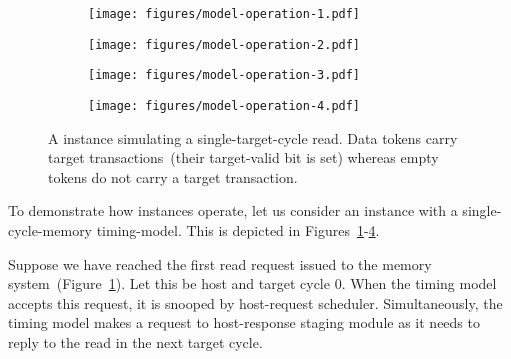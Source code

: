 \begin{figure*}[t]
	\centering
    \begin{subfigure}[t]{0.23\textwidth}
        \texttt{[image: figures/model-operation-1.pdf]}
        \caption{}
        \label{fig:model-operation-1}
    \end{subfigure}
    \begin{subfigure}[t]{0.24\textwidth}
        \texttt{[image: figures/model-operation-2.pdf]}
        \caption{}
        \label{fig:model-operation-2}
    \end{subfigure}
    \begin{subfigure}[t]{0.24\textwidth}
        \texttt{[image: figures/model-operation-3.pdf]}
        \caption{}
        \label{fig:model-operation-3}
    \end{subfigure}
    \begin{subfigure}[t]{0.23\textwidth}
        \texttt{[image: figures/model-operation-4.pdf]}
        \caption{}
        \label{fig:model-operation-4}
    \end{subfigure}
	\centering
    \caption{A \PNAME instance simulating a single-target-cycle read. Data
    tokens carry target transactions~(their target-valid bit is set) whereas
    empty tokens do not carry a target transaction.}
    \label{fig:model-operation}
\end{figure*}

To demonstrate how \PNAME instances operate, let us consider an instance with a
single-cycle-memory timing-model. This is depicted in Figures~\ref{fig:model-operation-1}-\ref{fig:model-operation-4}.

Suppose we have reached the first read request issued to the memory
system~(Figure~\ref{fig:model-operation-1}).  Let this be host and target cycle
0. When the timing model accepts this request, it is snooped by
host-request scheduler.  Simultaneously, the timing model makes a request
to host-response staging module as it needs to reply to the read in the next
target cycle.

